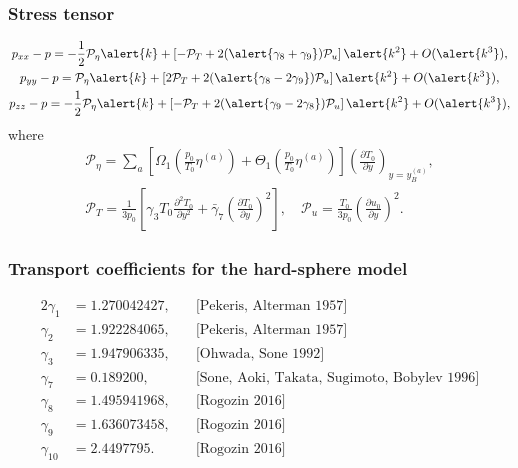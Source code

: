 \documentclass[mathserif]{beamer} %
\newcommand{\pder}[2][]{\frac{\partial#1}{\partial#2}}
\newcommand{\pderdual}[2][]{\frac{\partial^2#1}{\partial#2^2}}
\newcommand{\OO}[1]{O(#1)}
\begin{document}
\begin{frame}
    \frametitle{Stress tensor}
    \begin{gather}
        p_{xx} - p = -\frac12\mathcal{P}_\eta \alert{k}
            + \left[-\mathcal{P}_T + 2(\alert{\gamma_8+\gamma_9})\mathcal{P}_u\right]\alert{k^2}
            + \OO{\alert{k^3}}, \label{eq:Hilbert_Pxx}\\
        p_{yy} - p = \mathcal{P}_\eta \alert{k}
            + \left[2\mathcal{P}_T + 2(\alert{\gamma_8-2\gamma_9})\mathcal{P}_u\right]\alert{k^2}
            + \OO{\alert{k^3}}, \label{eq:Hilbert_Pyy}\\
        p_{zz} - p = -\frac12\mathcal{P}_\eta \alert{k}
            + \left[-\mathcal{P}_T + 2(\alert{\gamma_9-2\gamma_8})\mathcal{P}_u\right]\alert{k^2}
            + \OO{\alert{k^3}}, \label{eq:Hilbert_Pzz}
    \end{gather}
    where
    \begin{gather}\label{eq:mathcal_P_def}
        \mathcal{P}_\eta = \sum_a \left[\Omega_1\left(\frac{p_0}{T_0}\eta^{(a)}\right)
            + \Theta_1\left(\frac{p_0}{T_0}\eta^{(a)}\right)\right]\left(\pder[T_0]{y}\right)_{y=y_B^{(a)}}, \\
        \mathcal{P}_T = \frac1{3p_0}\left[\gamma_3 T_0 \pderdual[T_0]{y} + \bar{\gamma}_7\left(\pder[T_0]{y}\right)^2\right], \quad
        \mathcal{P}_u = \frac{T_0}{3p_0}\left(\pder[u_0]{y}\right)^2.
    \end{gather}
\end{frame}

\begin{frame}
    \frametitle{Transport coefficients for the hard-sphere model}
    \begin{alignat*}{2}
        \gamma_1 &= 1.270042427, \quad &\text{[Pekeris, Alterman 1957]} \\
        \gamma_2 &= 1.922284065, \quad &\text{[Pekeris, Alterman 1957]} \\
        \gamma_3 &= 1.947906335, \quad &\text{[Ohwada, Sone 1992]} \\
        \gamma_7 &= 0.189200,    \quad &\text{[Sone, Aoki, Takata, Sugimoto, Bobylev 1996]} \\
        \gamma_8 &= 1.495941968, \quad &\text{[Rogozin 2016]} \\
        \gamma_9 &= 1.636073458, \quad &\text{[Rogozin 2016]} \\
        \gamma_{10} &= 2.4497795.\quad &\text{[Rogozin 2016]}
    \end{alignat*}
\end{frame}
\end{document}
